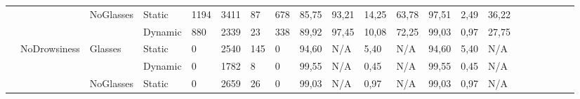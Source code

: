 \documentclass[12pt]{article}
\begin{document}
\begin{landscape}
\begin{table}[]
\begin{adjustbox}{width=1.4\textwidth}
\begin{tabular}{lllllllllllllllccllll}
				\multicolumn{1}{|l|}{} & \multicolumn{1}{l|}{} & \multicolumn{1}{l|}{\multirow{2}{*}{NoGlasses}} & \multicolumn{1}{l|}{Static}  & \multicolumn{1}{l|}{1194} & \multicolumn{1}{l|}{3411} & \multicolumn{1}{l|}{87} & \multicolumn{1}{l|}{678} & \multicolumn{1}{l|}{85,75} & \multicolumn{1}{l|}{93,21} & \multicolumn{1}{l|}{14,25} & \multicolumn{1}{l|}{63,78} & \multicolumn{1}{l|}{97,51} & \multicolumn{1}{l|}{2,49} & \multicolumn{1}{l|}{36,22} & \multicolumn{1}{c|}{} & \multicolumn{1}{c|}{} & \multicolumn{1}{l|}{} & \multicolumn{1}{l|}{} & \multicolumn{1}{l|}{} & \multicolumn{1}{l|}{}\\ \cline{4-15}
				\multicolumn{1}{|l|}{} & \multicolumn{1}{l|}{} & \multicolumn{1}{l|}{} & \multicolumn{1}{l|}{Dynamic} & \multicolumn{1}{l|}{880} & \multicolumn{1}{l|}{2339} & \multicolumn{1}{l|}{23} & \multicolumn{1}{l|}{338} & \multicolumn{1}{l|}{89,92} & \multicolumn{1}{l|}{97,45} & \multicolumn{1}{l|}{10,08} & \multicolumn{1}{l|}{72,25} & \multicolumn{1}{l|}{99,03} & \multicolumn{1}{l|}{0,97} & \multicolumn{1}{l|}{27,75} & \multicolumn{1}{c|}{} & \multicolumn{1}{c|}{} & \multicolumn{1}{l|}{} & \multicolumn{1}{l|}{} & \multicolumn{1}{l|}{} & \multicolumn{1}{l|}{} \\ \cline{2-15}
				\multicolumn{1}{|l|}{} & \multicolumn{1}{l|}{\multirow{4}{*}{NoDrowsiness}} & \multicolumn{1}{l|}{\multirow{2}{*}{Glasses}} & \multicolumn{1}{l|}{Static} & \multicolumn{1}{l|}{0} & \multicolumn{1}{l|}{2540} & \multicolumn{1}{l|}{145} & \multicolumn{1}{l|}{0} & \multicolumn{1}{l|}{94,60} & \multicolumn{1}{l|}{N/A} & \multicolumn{1}{l|}{5,40} & \multicolumn{1}{l|}{N/A} & \multicolumn{1}{l|}{94,60} & \multicolumn{1}{l|}{5,40} & \multicolumn{1}{l|}{N/A} & \multicolumn{1}{c|}{} & \multicolumn{1}{c|}{} & \multicolumn{1}{l|}{} & \multicolumn{1}{l|}{} & \multicolumn{1}{l|}{} & \multicolumn{1}{l|}{}\\ \cline{4-15}
				\multicolumn{1}{|l|}{} & \multicolumn{1}{l|}{} & \multicolumn{1}{l|}{} & \multicolumn{1}{l|}{Dynamic} & \multicolumn{1}{l|}{0} & \multicolumn{1}{l|}{1782} & \multicolumn{1}{l|}{8} & \multicolumn{1}{l|}{0} & \multicolumn{1}{l|}{99,55} & \multicolumn{1}{l|}{N/A} & \multicolumn{1}{l|}{0,45} & \multicolumn{1}{l|}{N/A} & \multicolumn{1}{l|}{99,55} & \multicolumn{1}{l|}{0,45} & \multicolumn{1}{l|}{N/A} & \multicolumn{1}{c|}{} & \multicolumn{1}{c|}{} & \multicolumn{1}{l|}{} & \multicolumn{1}{l|}{} & \multicolumn{1}{l|}{} & \multicolumn{1}{l|}{}\\ \cline{3-15}
				\multicolumn{1}{|l|}{} & \multicolumn{1}{l|}{} & \multicolumn{1}{l|}{\multirow{2}{*}{NoGlasses}} & \multicolumn{1}{l|}{Static} & \multicolumn{1}{l|}{0} & \multicolumn{1}{l|}{2659} & \multicolumn{1}{l|}{26} & \multicolumn{1}{l|}{0} & \multicolumn{1}{l|}{99,03} & \multicolumn{1}{l|}{N/A} & \multicolumn{1}{l|}{0,97} & \multicolumn{1}{l|}{N/A} & \multicolumn{1}{l|}{99,03} & \multicolumn{1}{l|}{0,97} & \multicolumn{1}{l|}{N/A} & \multicolumn{1}{c|}{} & \multicolumn{1}{c|}{} & \multicolumn{1}{l|}{} & \multicolumn{1}{l|}{} & \multicolumn{1}{l|}{} & \multicolumn{1}{l|}{} \\ \cline{4-15}

\end{tabular}
\end{adjustbox}
\end{table}
\end{landscape}
\end{document}
